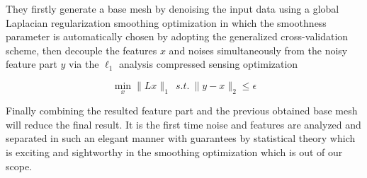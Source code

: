 They firstly generate a base mesh by denoising the input data using a global Laplacian regularization smoothing optimization in which the smoothness parameter is automatically chosen by adopting the generalized cross-validation scheme,
then decouple the features $x$ and noises simultaneously from the noisy feature part $y$ via the $\ell_1$ analysis compressed sensing optimization

\small{
\begin{equation}
 \label{eq:decoupling}
 \min_{x}\|Lx\|_1~~ s.t. ~ \|y-x\|_2 \le \epsilon
\end{equation}
}

Finally combining the resulted feature part and the previous obtained base mesh will reduce the final result. It is the first time noise and features are analyzed and separated in such an elegant manner with guarantees by statistical theory which is exciting and sightworthy in the smoothing optimization which is out of our scope. %